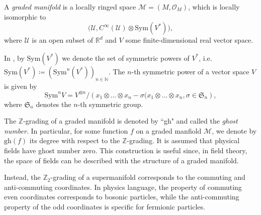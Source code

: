 \begin{definition}
    \label{def:graded_manifold}
    A \emph{graded manifold} is a locally ringed space $\mathcal{M} = (M, \mathcal{O}_M)$, which is locally isomorphic to
    \begin{equation*}
        \Big(\mathcal{U}, C^\infty(\mathcal{U}) \otimes \text{Sym}(V^*) \Big),
    \end{equation*}
    where $\mathcal{U}$ is an open subset of $\mathbb{R}^d$ and $V$ some finite-dimensional real vector space.
\end{definition}
 In , by $\text{Sym}(V^*)$ we denote the set of symmetric powers of $V^*$, i.e. $\text{Sym}(V^*) \coloneqq \left( \text{Sym}^n(V^*) \right)_{n \in \mathbb{N}}$. The $n$-th symmetric power of a vector space $V$ is given by
 \begin{equation*}
     \text{Sym}^n V =
     V^{\otimes n} /
     \left( x_1 \otimes \ldots \otimes x_n - \sigma (x_1 \otimes \ldots \otimes x_n,
     \sigma \in \mathfrak{S}_n \right),
 \end{equation*}
 where $\mathfrak{S}_n$ denotes the $n$-th symmetric group.

The $\mathbb{Z}$-grading of a graded manifold is denoted by “gh" and called the \emph{ghost number}.
In particular, for some function $f$ on a graded manfiold $\mathcal{M}$, we denote by $\text{gh}(f)$ its degree with respect to the $\mathbb{Z}$-grading.
It is assumed that physical fields have ghost number zero.
This construction is useful since, in field theory, the space of fields can be described with the structure of a graded manifold.

Instead, the $\mathbb{Z}_2$-grading of a supermanifold corresponds to the commuting and anti-commuting coordinates.
In physics language, the property of commuting even coordinates corresponds to bosonic particles, while the anti-commuting property of the odd coordinates is specific for fermionic particles.